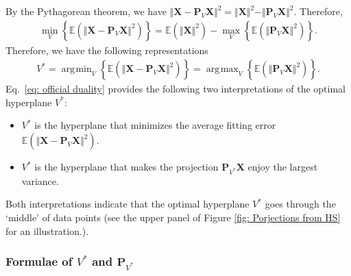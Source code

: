 \documentclass[11pt,letterpaper, leqno]{article}
\DeclareMathOperator*{\argmax}{\arg\!\max}
\DeclareMathOperator*{\argmin}{\arg\!\min}
\numberwithin{equation}{section}
\numberwithin{theorem}{section}
\numberwithin{lemma}{section}
\numberwithin{corollary}{section}
\numberwithin{definition}{section}
\numberwithin{proposition}{section}
\numberwithin{remark}{section}
\numberwithin{example}{section}
\begin{document}
By the Pythagorean theorem, we have $\Vert \boldsymbol{X} - \boldsymbol{P}_V \boldsymbol{X} \Vert^2 = \Vert \boldsymbol{X} \Vert^2 - \Vert \boldsymbol{P}_V \boldsymbol{X} \Vert^2$. Therefore,
\begin{align*}
    \min_{V} \left\{ \mathbb{E}\left(\Vert \boldsymbol{X} - \boldsymbol{P}_V \boldsymbol{X} \Vert^2\right)\right\} = \mathbb{E}\left(\Vert \boldsymbol{X} \Vert^2 \right) - \max_V \left\{\mathbb{E}\left( \Vert \boldsymbol{P}_V \boldsymbol{X} \Vert^2 \right)\right\}.
\end{align*}
Therefore, we have the following representations
\begin{align}\label{eq: official duality}
    \boxed{ V^*=\argmin_{V} \left\{ \mathbb{E}\left(\Vert \boldsymbol{X} - \boldsymbol{P}_V \boldsymbol{X} \Vert^2\right)\right\} = \argmax_V \left\{\mathbb{E}\left( \Vert \boldsymbol{P}_V \boldsymbol{X} \Vert^2 \right)\right\}.}
\end{align}
Eq.~\eqref{eq: official duality} provides the following two interpretations of the optimal hyperplane $V^*$:
\begin{itemize}
    \item $V^*$ is the hyperplane that minimizes the average fitting error $\mathbb{E}\left(\Vert \boldsymbol{X} - \boldsymbol{P}_V \boldsymbol{X} \Vert^2\right)$.

    \item $V^*$ is the hyperplane that makes the projection $\boldsymbol{P}_{V^*}\boldsymbol{X}$ enjoy the largest variance.
\end{itemize}
Both interpretations indicate that the optimal hyperplane $V^*$ goes through the `middle' of data points (see the upper panel of Figure \ref{fig: Porjections from HS} for an illustration.).


\subsubsection{Formulae of $V^*$ and $\boldsymbol{P}_{V^*}$}
\end{document}
